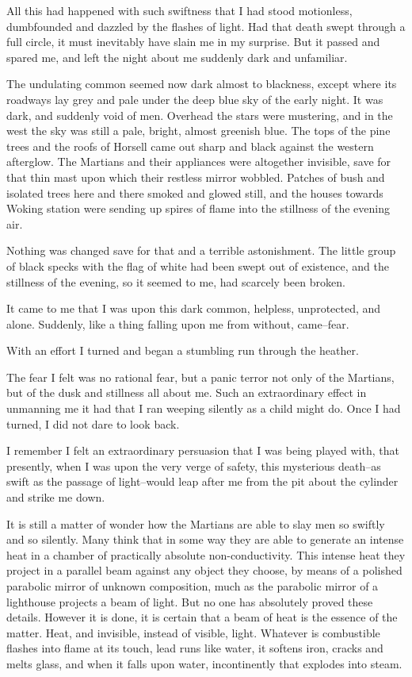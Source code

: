 All this had happened with such swiftness that I had stood
motionless, dumbfounded and dazzled by the flashes of light. Had
that death swept through a full circle, it must inevitably have
slain me in my surprise. But it passed and spared me, and left the
night about me suddenly dark and unfamiliar.

The undulating common seemed now dark almost to blackness, except
where its roadways lay grey and pale under the deep blue sky of the
early night. It was dark, and suddenly void of men. Overhead the
stars were mustering, and in the west the sky was still a pale,
bright, almost greenish blue. The tops of the pine trees and the
roofs of Horsell came out sharp and black against the western
afterglow. The Martians and their appliances were altogether
invisible, save for that thin mast upon which their restless mirror
wobbled. Patches of bush and isolated trees here and there smoked
and glowed still, and the houses towards Woking station were
sending up spires of flame into the stillness of the evening air.

Nothing was changed save for that and a terrible astonishment. The
little group of black specks with the flag of white had been swept
out of existence, and the stillness of the evening, so it seemed to
me, had scarcely been broken.

It came to me that I was upon this dark common, helpless,
unprotected, and alone. Suddenly, like a thing falling upon me from
without, came--fear.

With an effort I turned and began a stumbling run through the
heather.

The fear I felt was no rational fear, but a panic terror not only
of the Martians, but of the dusk and stillness all about me. Such
an extraordinary effect in unmanning me it had that I ran weeping
silently as a child might do. Once I had turned, I did not dare to
look back.

I remember I felt an extraordinary persuasion that I was being
played with, that presently, when I was upon the very verge of
safety, this mysterious death--as swift as the passage of
light--would leap after me from the pit about the cylinder and
strike me down.

It is still a matter of wonder how the Martians are able to slay
men so swiftly and so silently. Many think that in some way they
are able to generate an intense heat in a chamber of practically
absolute non-conductivity. This intense heat they project in a
parallel beam against any object they choose, by means of a
polished parabolic mirror of unknown composition, much as the
parabolic mirror of a lighthouse projects a beam of light. But no
one has absolutely proved these details. However it is done, it is
certain that a beam of heat is the essence of the matter. Heat, and
invisible, instead of visible, light. Whatever is combustible
flashes into flame at its touch, lead runs like water, it softens
iron, cracks and melts glass, and when it falls upon water,
incontinently that explodes into steam.

